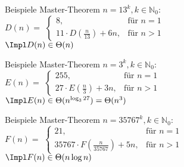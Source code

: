\begin{frame}{Beispiele Master-Theorem}
	$n = 13^k, k \in \mathbb{N}_0$: \\[0,25cm]
	$D(n) = $
	\begin{math}
		\begin{cases}
		8,                              & \text{für } n = 1 \\
		11 \cdot D(\frac{n}{13}) + 6n,  & \text{für } n > 1
		\end{cases}
	\end{math} \\[0,5cm]
	\pause
	$\Impl D(n) \in \Theta(n)$
\end{frame}


\begin{frame}{Beispiele Master-Theorem}
	$n = 3^k, k \in \mathbb{N}_0$: \\[0,25cm]
	$E(n) = $ 
	\begin{math}
		\begin{cases}
		255,                            & \text{für } n = 1 \\
		27 \cdot E(\frac{n}{3}) + 3n,   & \text{für } n > 1
		\end{cases}
	\end{math} \\[0,5cm]
	\pause
	$\Impl E(n) \in \Theta(n^{\log _{3}27}) = \Theta(n^3)$
\end{frame}


\begin{frame}{Beispiele Master-Theorem}
	$n = 35767^k, k \in \mathbb{N}_0$: \\[0,25cm]
	$F(n) = $
	\begin{math}
		\begin{cases}
		21,                                   & \text{für } n = 1 \\
		35767 \cdot F(\frac{n}{35767}) + 5n,  & \text{für } n > 1
		\end{cases}
	\end{math} \\[0,5cm]
	\pause
	$\Impl F(n) \in \Theta(n\log n)$
\end{frame}

\fi